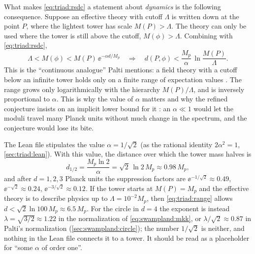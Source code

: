What makes \eqref{eq:triad:rsdc} a statement about \emph{dynamics} is the following
consequence. Suppose an effective theory with cutoff $\Lambda$ is written down at the point $P$,
where the lightest tower has scale $M(P)>\Lambda$. The theory can only be used where the tower
is still above the cutoff, $M(\phi)>\Lambda$. Combining with \eqref{eq:triad:rsdc},
\begin{equation}\label{eq:triad:range}
\Lambda<M(\phi)<M(P)\,\ee^{-\alpha d/M_p}\quad\Longrightarrow\quad
d(P,\phi)<\frac{M_p}{\alpha}\,\ln\frac{M(P)}{\Lambda}.
\end{equation}
This is the ``continuous analogue'' Palti mentions: a field theory with a cutoff below an
infinite tower holds only on a finite range of expectation values . The range grows only logarithmically with the hierarchy $M(P)/\Lambda$, and is
inversely proportional to $\alpha$. This is why the value of $\alpha$ matters and why the
refined conjecture insists on an implicit lower bound for it : an $\alpha\ll1$ would let the moduli travel many Planck units without much
change in the spectrum, and the conjecture would lose its bite.

\begin{example}\label{ex:triad:halving}
The Lean file  stipulates the value $\alpha=1/\sqrt2$ (as the
rational identity $2\alpha^2=1$, \cref{sec:triad:lean}). With this value, the distance over
which the tower mass halves is
\[
d_{1/2}=\frac{M_p\ln2}{\alpha}=\sqrt2\,\ln2\,M_p\approx0.98\,M_p ,
\]
and after $d=1,2,3$ Planck units the suppression factors are
$\ee^{-1/\sqrt2}\approx0.49$, $\ee^{-\sqrt2}\approx0.24$, $\ee^{-3/\sqrt2}\approx0.12$.
If the tower starts at $M(P)=M_p$ and the effective theory is to describe physics up to
$\Lambda=10^{-2}M_p$, then \eqref{eq:triad:range} allows
$d<\sqrt2\ln100\,M_p\approx6.5\,M_p$. For the circle in $d=4$ the exponent is instead
$\lambda=\sqrt{3/2}\approx1.22$ in the normalization of \eqref{eq:swampland:mkk}, or
$\lambda/\sqrt2\approx0.87$ in Palti's normalization (\cref{sec:swampland:circle}); the number
$1/\sqrt2$ is neither, and nothing in the Lean file connects it to a tower. It should be read
as a placeholder for ``some $\alpha$ of order one''.
\end{example}

